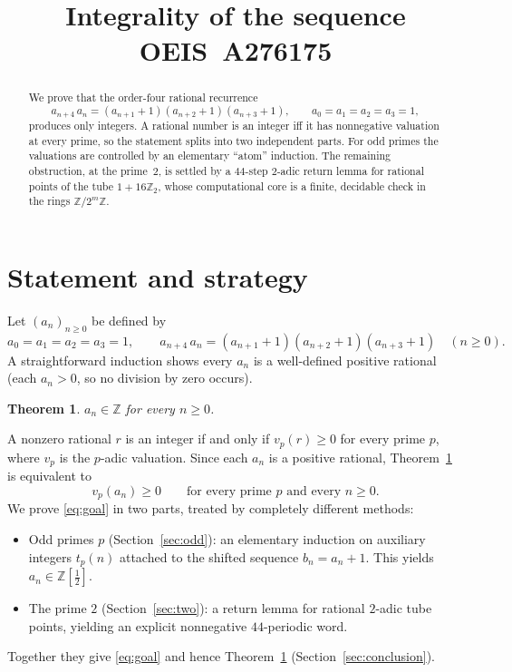 \documentclass[11pt]{article}
\title{Integrality of the sequence OEIS~A276175}
\author{}
\date{}
\newtheorem{theorem}{Theorem}
\theoremstyle{remark}
\newcommand{\Z}{\mathbb{Z}}
\newcommand{\Ztwo}{\mathbb{Z}_2}
\newcommand{\vp}{v_p}
\begin{document}
\maketitle

\begin{abstract}
We prove that the order-four rational recurrence
\[
a_{n+4}\,a_n=(a_{n+1}+1)(a_{n+2}+1)(a_{n+3}+1),
\qquad a_0=a_1=a_2=a_3=1,
\]
produces only integers.  A rational number is an integer iff it has
nonnegative valuation at every prime, so the statement splits into two
independent parts.  For odd primes the valuations are controlled by an
elementary ``atom'' induction.  The remaining obstruction, at the prime~$2$,
is settled by a $44$-step $2$-adic return lemma for rational points of the tube
$1+16\Ztwo$, whose computational core is a finite, decidable check in the rings
$\Z/2^m\Z$.
\end{abstract}

\section{Statement and strategy}

Let $(a_n)_{n\ge0}$ be defined by
\begin{equation}
a_0=a_1=a_2=a_3=1,\qquad
a_{n+4}\,a_n=(a_{n+1}+1)(a_{n+2}+1)(a_{n+3}+1)\quad(n\ge0).
\label{eq:rec}
\end{equation}
A straightforward induction shows every $a_n$ is a well-defined positive
rational (each $a_n>0$, so no division by zero occurs).

\begin{theorem}\label{thm:main}
$a_n\in\Z$ for every $n\ge0$.
\end{theorem}

A nonzero rational $r$ is an integer if and only if $\vp(r)\ge0$ for every
prime $p$, where $\vp$ is the $p$-adic valuation.  Since each $a_n$ is a
positive rational, Theorem~\ref{thm:main} is equivalent to
\begin{equation}
\vp(a_n)\ge0\qquad\text{for every prime }p\text{ and every }n\ge0.
\label{eq:goal}
\end{equation}
We prove \eqref{eq:goal} in two parts, treated by completely different
methods:
\begin{itemize}
\item Odd primes $p$ (Section~\ref{sec:odd}): an elementary induction on
      auxiliary integers $t_p(n)$ attached to the shifted sequence
      $b_n=a_n+1$.  This yields $a_n\in\Z[\tfrac12]$.
\item The prime $2$ (Section~\ref{sec:two}): a return lemma for rational
      $2$-adic tube points, yielding an explicit nonnegative $44$-periodic word.
\end{itemize}
Together they give \eqref{eq:goal} and hence Theorem~\ref{thm:main}
(Section~\ref{sec:conclusion}).
\end{document}
